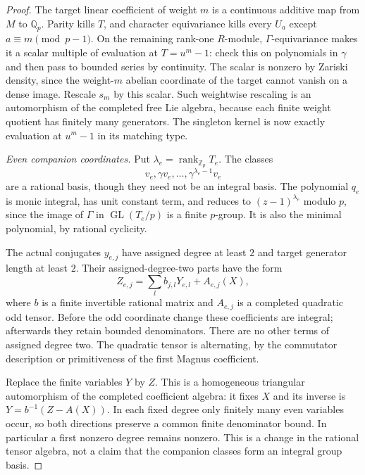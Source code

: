 \documentclass[11pt,a4paper]{article}
\theoremstyle{definition}
\begin{document}
\begin{proof}
The target linear coefficient of weight $m$ is a continuous additive
map from $M$ to $\mathbb Q_p$. Parity kills $T$, and character
equivariance kills every $U_a$ except $a\equiv m\pmod{p-1}$.
On the remaining rank-one $R$-module, $\Gamma$-equivariance makes
it a scalar multiple of evaluation at $T=u^m-1$: check this on
polynomials in $\gamma$ and then pass to bounded series by
continuity. The scalar is nonzero by Zariski density, since the
weight-$m$ abelian coordinate of the target cannot vanish on a
dense image. Rescale $s_m$ by this scalar. Such weightwise rescaling
is an automorphism of the completed free Lie algebra, because each
finite weight quotient has finitely many generators. The singleton
kernel is now exactly evaluation at $u^m-1$ in its matching type.

\emph{Even companion coordinates.}
Put $\lambda_e=\operatorname{rank}_{\mathbb Z_p}T_e$. The classes
\[
 v_e,\gamma v_e,\ldots,\gamma^{\lambda_e-1}v_e
\]
are a rational basis, though they need not be an integral basis.
The polynomial $q_e$ is monic integral, has unit constant term,
and reduces to $(z-1)^{\lambda_e}$ modulo $p$, since the image of
$\Gamma$ in $\operatorname{GL}(T_e/p)$ is a finite $p$-group.
It is also the minimal polynomial, by rational cyclicity.

The actual conjugates $y_{e,j}$ have assigned degree at least $2$
and target generator length at least $2$. Their assigned-degree-two
parts have the form
\[
 Z_{e,j}=\sum_l b_{j,l}Y_{e,l}+A_{e,j}(X),                    \tag{GM.3}
\]
where $b$ is a finite invertible rational matrix and $A_{e,j}$ is
a completed quadratic odd tensor. Before the odd coordinate change
these coefficients are integral; afterwards they retain bounded
denominators. There are no other terms of assigned degree two.
The quadratic tensor is alternating, by the commutator description
or primitiveness of the first Magnus coefficient.

Replace the finite variables $Y$ by $Z$. This is a homogeneous
triangular automorphism of the completed coefficient algebra:
it fixes $X$ and its inverse is $Y=b^{-1}(Z-A(X))$.
In each fixed degree only finitely many even variables occur,
so both directions preserve a common finite denominator bound.
In particular a first nonzero degree remains nonzero.
This is a change in the rational tensor algebra, not a claim that
the companion classes form an integral group basis.


\end{proof}
\end{document}
